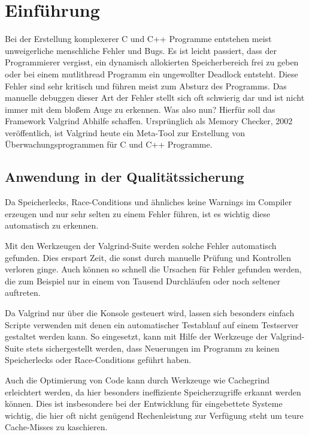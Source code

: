 \section{Einführung}
Bei der Erstellung komplexerer C und C++ Programme entstehen meist unweigerliche menschliche Fehler und Bugs. Es ist leicht passiert, dass der Programmierer vergisst, ein dynamisch allokierten Speicherbereich frei zu geben oder bei einem mutlithread Programm ein ungewollter Deadlock entsteht. Diese Fehler sind sehr kritisch und führen meist zum Absturz des Programms. Das manuelle debuggen dieser Art der Fehler stellt sich oft schwierig dar und ist nicht immer mit dem bloßem Auge zu erkennen. Was also nun? Hierfür soll das Framework Valgrind Abhilfe schaffen. Ursprünglich als Memory Checker, 2002 veröffentlich, ist Valgrind heute ein Meta-Tool zur Erstellung von Überwachungsprogrammen für C und C++ Programme.

\subsection{Anwendung in der Qualitätssicherung}
Da Speicherlecks, Race-Conditions und ähnliches keine Warnings im Compiler erzeugen und nur sehr selten zu einem Fehler führen, ist es wichtig diese automatisch zu erkennen. 

Mit den Werkzeugen der Valgrind-Suite werden solche Fehler automatisch gefunden. Dies erspart Zeit, die sonst durch manuelle Prüfung und Kontrollen verloren ginge. Auch können so schnell die Ursachen für Fehler gefunden werden, die zum Beispiel nur in einem von Tausend Durchläufen oder noch seltener auftreten.

Da Valgrind nur über die Konsole gesteuert wird, lassen sich besonders einfach Scripte verwenden mit denen ein automatischer Testablauf auf einem Testserver gestaltet werden kann. So eingesetzt, kann mit Hilfe der Werkzeuge der Valgrind-Suite stets sichergestellt werden, dass Neuerungen im Programm zu keinen Speicherlecks oder Race-Conditions geführt haben. 

Auch die Optimierung von Code kann durch Werkzeuge wie Cachegrind erleichtert werden, da hier besonders ineffiziente Speicherzugriffe erkannt werden können. Dies ist insbesondere bei der Entwicklung für eingebettete Systeme wichtig, die hier oft nicht genügend Rechenleistung zur Verfügung steht um teure Cache-Misses zu kaschieren. 
